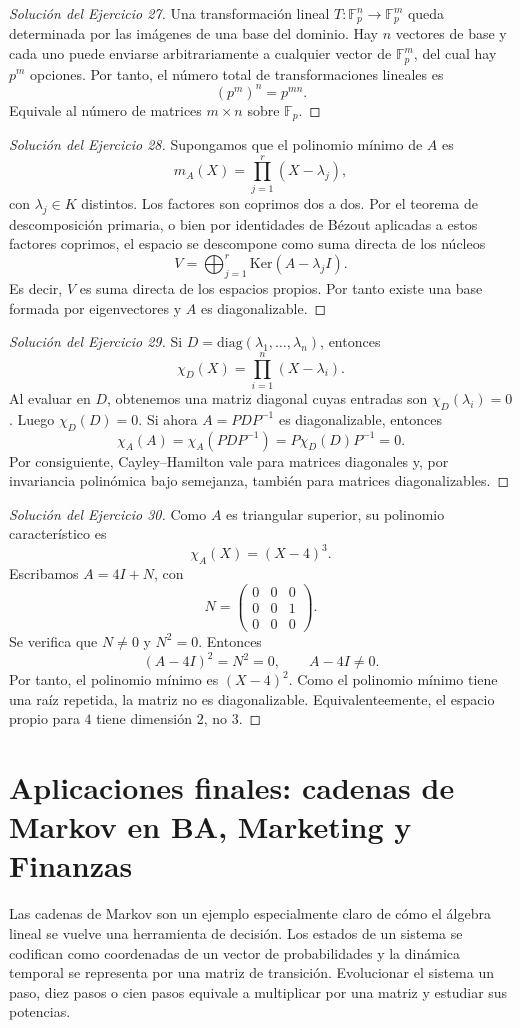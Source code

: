 \documentclass[10pt,a4paper,oneside]{article}
\theoremstyle{plain}
\theoremstyle{definition}
\theoremstyle{remark}
\newcommand{\F}{\mathbb{F}}
\newcommand{\Ker}{\mathrm{Ker}}
\newcommand{\diag}{\mathrm{diag}}
\begin{document}
\begin{proof}[Solución del Ejercicio 27]
Una transformación lineal \(T:\F_p^n\to\F_p^m\) queda determinada por las imágenes de una base del dominio. Hay \(n\) vectores de base y cada uno puede enviarse arbitrariamente a cualquier vector de \(\F_p^m\), del cual hay \(p^m\) opciones. Por tanto, el número total de transformaciones lineales es
\[(p^m)^n=p^{mn}.
\]
Equivale al número de matrices \(m\times n\) sobre \(\F_p\).
\end{proof}
\begin{proof}[Solución del Ejercicio 28]
Supongamos que el polinomio mínimo de \(A\) es
\[m_A(X)=\prod_{j=1}^r (X-\lambda_j),
\]
con \(\lambda_j\in K\) distintos. Los factores son coprimos dos a dos. Por el teorema de descomposición primaria, o bien por identidades de Bézout aplicadas a estos factores coprimos, el espacio se descompone como suma directa de los núcleos
\[V=\bigoplus_{j=1}^r \Ker(A-\lambda_j I).
\]
Es decir, \(V\) es suma directa de los espacios propios. Por tanto existe una base formada por eigenvectores y \(A\) es diagonalizable.
\end{proof}
\begin{proof}[Solución del Ejercicio 29]
Si \(D=\diag(\lambda_1,\dots,\lambda_n)\), entonces
\[\chi_D(X)=\prod_{i=1}^n (X-\lambda_i).
\]
Al evaluar en \(D\), obtenemos una matriz diagonal cuyas entradas son \(\chi_D(\lambda_i)=0\). Luego \(\chi_D(D)=0\). Si ahora \(A=PDP^{-1}\) es diagonalizable, entonces
\[\chi_A(A)=\chi_A(PDP^{-1})=P\chi_D(D)P^{-1}=0.
\]
Por consiguiente, Cayley--Hamilton vale para matrices diagonales y, por invariancia polinómica bajo semejanza, también para matrices diagonalizables.
\end{proof}
\begin{proof}[Solución del Ejercicio 30]
Como \(A\) es triangular superior, su polinomio característico es
\[\chi_A(X)=(X-4)^3.
\]
Escribamos \(A=4I+N\), con
\[N=\begin{pmatrix}0&0&0\\0&0&1\\0&0&0\end{pmatrix}.
\]
Se verifica que \(N\neq0\) y \(N^2=0\). Entonces
\[(A-4I)^2=N^2=0,
\qquad
A-4I\neq0.
\]
Por tanto, el polinomio mínimo es \((X-4)^2\). Como el polinomio mínimo tiene una raíz repetida, la matriz no es diagonalizable. Equivalenteemente, el espacio propio para \(4\) tiene dimensión \(2\), no \(3\).
\end{proof}

\section{Aplicaciones finales: cadenas de Markov en BA, Marketing y Finanzas}
\begin{ideaBox}
Las cadenas de Markov son un ejemplo especialmente claro de cómo el álgebra lineal se vuelve una herramienta de decisión. Los estados de un sistema se codifican como coordenadas de un vector de probabilidades y la dinámica temporal se representa por una matriz de transición. Evolucionar el sistema un paso, diez pasos o cien pasos equivale a multiplicar por una matriz y estudiar sus potencias.
\end{ideaBox}
\end{document}
